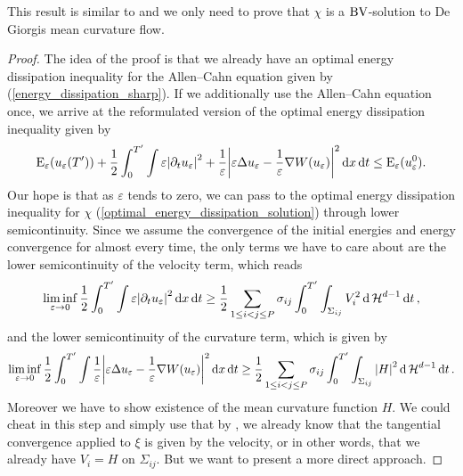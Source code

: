 This result is similar to  and we only need 
to prove that $ \chi $ is a $ \operatorname{BV} $-solution to De Giorgis mean curvature flow.

\begin{proof}
	The idea of the proof is that we already have an optimal energy dissipation 
	inequality for the Allen--Cahn equation given by 
	(\ref{energy_dissipation_sharp}).
	If we additionally use the Allen--Cahn equation once, we arrive at 
	the reformulated version of the optimal energy dissipation inequality given 
	by
	\begin{equation*}
	\label{energy_dissipation_sharp_with_curvature}
	\operatorname{E}_{ \varepsilon } ( u_{ \varepsilon } ( T' ) )
	+
	\frac{ 1 }{ 2 }
	\int_{ 0 }^{ T' }
		\int
			\varepsilon \abs{ \partial_{ t } u_{ \varepsilon } }^{ 2 }
			+
			\frac{ 1 }{ \varepsilon }
			\abs{
				\varepsilon \Delta u_{ \varepsilon } 
				-
				\frac{ 1 }{ \varepsilon } \nabla W ( u_{ \varepsilon } )
			}^{ 2 }
		\dd{ x }
	\dd{ t }
	\leq
	\operatorname{E}_{ \varepsilon } ( u_{ \varepsilon}^{ 0 } ).
	\end{equation*}
	Our hope is that as $ \varepsilon $ tends to zero, we can pass to the 
	optimal energy dissipation inequality for $ \chi $ 
	(\ref{optimal_energy_dissipation_solution}) through lower 
	semicontinuity. 
	Since we assume the convergence of the initial energies and energy 
	convergence for almost every time, the only terms we have to care about are 
	the lower semicontinuity of the velocity term, which reads
	\begin{equation}
		\label{lsc_of_velocity}
		\liminf_{ \varepsilon \to 0 }
			\frac{ 1 }{ 2 }
			\int_{ 0 }^{ T' }
				\int
					\varepsilon 
					\abs{ \partial_{ t } u_{ \varepsilon } }^{ 2 }
				\dd{ x }
			\dd{ t }
		\geq
		\frac{ 1 }{ 2 }
		\sum_{ 1 \leq i < j \leq P }
			\sigma_{ i j }
			\int_{ 0 }^{ T' }
				\int_{ \Sigma_{ i j } }
					V_{ i }^{ 2 }
				\dd{ \operatorname{\mathcal{H}}^{ d - 1 } }
			\dd{ t },
	\end{equation}
	and the lower semicontinuity of the curvature term, which is given by
	\begin{equation}
		\label{lsc_of_curvature}
		\liminf_{ \varepsilon \to 0 }
			\frac{ 1 }{ 2 }
			\int_{ 0 }^{ T' }
				\int
					\frac{ 1 }{ \varepsilon }
					\abs{
						\varepsilon
						\Delta u_{ \varepsilon }
						-
						\frac{ 1 }{ \varepsilon }
						\nabla W ( u_{ \varepsilon } ) 
					}^{ 2 }
				\dd{ x }
			\dd{ t }
		\geq
		\frac{ 1 }{ 2 }
		\sum_{ 1 \leq i < j \leq P }
			\sigma_{ i j }
			\int_{ 0 }^{ T' }
				\int_{ \Sigma_{ i j } }
					\abs{ H }^{ 2 }
				\dd{ \operatorname{\mathcal{H}}^{ d - 1 } }
			\dd{ t }.
	\end{equation}
	Moreover we have to show existence of the mean curvature function $ H $.
	We could cheat in this step and simply use that by 
	, we already know that the tangential 
	convergence applied to $ \xi $ is given by the velocity, or in other words, 
	that we already have $ V_{ i } = H $ on $ \Sigma_{ i j } $. But we want 
	to present a more direct approach.
	

\end{proof}
